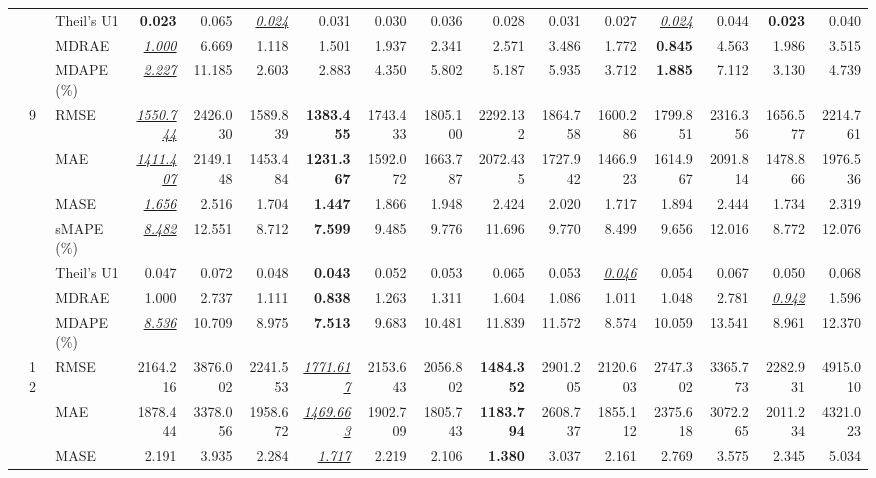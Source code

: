 \begin{table}[!htbp]
{\begin{tabular}{lllrrrrrrrrrrrrr}
 &  & Theil's U1 & \textbf{0.023} & 0.065 & \underline{\textit{0.024}} & 0.031 & 0.030 & 0.036 & 0.028 & 0.031 & 0.027 & \underline{\textit{0.024}} & 0.044 & \textbf{0.023} & 0.040 \\
 &  & MDRAE & \underline{\textit{1.000}} & 6.669 & 1.118 & 1.501 & 1.937 & 2.341 & 2.571 & 3.486 & 1.772 & \textbf{0.845} & 4.563 & 1.986 & 3.515 \\
 &  & MDAPE (\%) & \underline{\textit{2.227}} & 11.185 & 2.603 & 2.883 & 4.350 & 5.802 & 5.187 & 5.935 & 3.712 & \textbf{1.885} & 7.112 & 3.130 & 4.739 \\
\cmidrule(lr){2-16}
 & 9 & RMSE & \underline{\textit{1550.744}} & 2426.030 & 1589.839 & \textbf{1383.455} & 1743.433 & 1805.100 & 2292.132 & 1864.758 & 1600.286 & 1799.851 & 2316.356 & 1656.577 & 2214.761 \\
 &  & MAE & \underline{\textit{1411.407}} & 2149.148 & 1453.484 & \textbf{1231.367} & 1592.072 & 1663.787 & 2072.435 & 1727.942 & 1466.923 & 1614.967 & 2091.814 & 1478.866 & 1976.536 \\
 &  & MASE & \underline{\textit{1.656}} & 2.516 & 1.704 & \textbf{1.447} & 1.866 & 1.948 & 2.424 & 2.020 & 1.717 & 1.894 & 2.444 & 1.734 & 2.319 \\
 &  & sMAPE (\%) & \underline{\textit{8.482}} & 12.551 & 8.712 & \textbf{7.599} & 9.485 & 9.776 & 11.696 & 9.770 & 8.499 & 9.656 & 12.016 & 8.772 & 12.076 \\
 &  & Theil's U1 & 0.047 & 0.072 & 0.048 & \textbf{0.043} & 0.052 & 0.053 & 0.065 & 0.053 & \underline{\textit{0.046}} & 0.054 & 0.067 & 0.050 & 0.068 \\
 &  & MDRAE & 1.000 & 2.737 & 1.111 & \textbf{0.838} & 1.263 & 1.311 & 1.604 & 1.086 & 1.011 & 1.048 & 2.781 & \underline{\textit{0.942}} & 1.596 \\
 &  & MDAPE (\%) & \underline{\textit{8.536}} & 10.709 & 8.975 & \textbf{7.513} & 9.683 & 10.481 & 11.839 & 11.572 & 8.574 & 10.059 & 13.541 & 8.961 & 12.370 \\
\cmidrule(lr){2-16}
 & 12 & RMSE & 2164.216 & 3876.002 & 2241.553 & \underline{\textit{1771.617}} & 2153.643 & 2056.802 & \textbf{1484.352} & 2901.205 & 2120.603 & 2747.302 & 3365.773 & 2282.931 & 4915.010 \\
 &  & MAE & 1878.444 & 3378.056 & 1958.672 & \underline{\textit{1469.663}} & 1902.709 & 1805.743 & \textbf{1183.794} & 2608.737 & 1855.112 & 2375.618 & 3072.265 & 2011.234 & 4321.023 \\
 &  & MASE & 2.191 & 3.935 & 2.284 & \underline{\textit{1.717}} & 2.219 & 2.106 & \textbf{1.380} & 3.037 & 2.161 & 2.769 & 3.575 & 2.345 & 5.034 \\

\end{tabular}}
\end{table}
